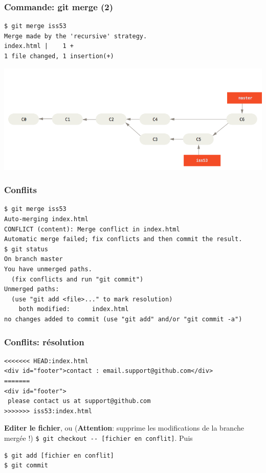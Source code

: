 \documentclass{beamer}
\begin{document}
\begin{frame}[fragile]
    \frametitle{Commande: git merge (2)}
\begin{lstlisting}
$ git merge iss53
Merge made by the 'recursive' strategy.
index.html |    1 +
1 file changed, 1 insertion(+)
\end{lstlisting}
\begin{center}
    \includegraphics[width=\textwidth,trim=0 0 0 40, clip]{img/basic-merging-2.png}
\end{center}
\end{frame}

\begin{frame}[fragile]
    \frametitle{Conflits}
\begin{lstlisting}
$ git merge iss53
Auto-merging index.html
CONFLICT (content): Merge conflict in index.html
Automatic merge failed; fix conflicts and then commit the result.
$ git status
On branch master
You have unmerged paths.
  (fix conflicts and run "git commit")
Unmerged paths:
  (use "git add <file>..." to mark resolution)
    both modified:      index.html
no changes added to commit (use "git add" and/or "git commit -a")
\end{lstlisting}
\end{frame}

\begin{frame}[fragile]
    \frametitle{Conflits: résolution}
\begin{lstlisting}
<<<<<<< HEAD:index.html
<div id="footer">contact : email.support@github.com</div>
=======
<div id="footer">
 please contact us at support@github.com
>>>>>>> iss53:index.html
\end{lstlisting}
\textbf{Editer le fichier}, ou
(\textbf{Attention}: supprime les modifications de la branche mergée !)
\lstinline{$ git checkout -- [fichier en conflit]}.
Puis
\begin{lstlisting}
$ git add [fichier en conflit]
$ git commit
\end{lstlisting}
\end{frame}
\end{document}
